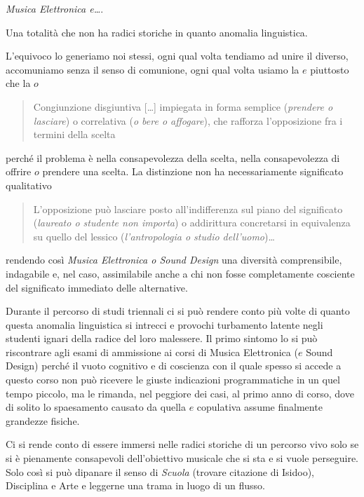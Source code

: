 \documentclass[
	10pt,
	a4paper,
	twocolumn
	]{article}
\begin{document}
\emph{Musica Elettronica e\ldots}. 

Una totalità che non ha radici storiche in quanto anomalia linguistica.

L'equivoco lo generiamo noi stessi, ogni qual volta tendiamo ad unire il diverso, accomuniamo senza il senso di comunione, ogni qual volta usiamo la $ e $ piuttosto che la $ o $

\begin{quote}
Congiunzione disgiuntiva [\ldots]  impiegata in forma semplice (\emph{prendere o lasciare}) o correlativa (\emph{o bere o affogare}), che rafforza l'opposizione fra i termini della scelta
\end{quote}

perché il problema è nella consapevolezza della scelta, nella consapevolezza di offrire $ o $ prendere una scelta. La distinzione non ha necessariamente significato qualitativo

\begin{quote}
L'opposizione può lasciare posto all'indifferenza sul piano del significato (\emph{laureato o studente non importa}) o addirittura concretarsi in equivalenza su quello del lessico (\emph{l'antropologia o studio dell'uomo})\ldots
\end{quote}

rendendo così \emph{Musica Elettronica o Sound Design} una diversità comprensibile, indagabile e, nel caso, assimilabile anche a chi non fosse completamente cosciente del significato immediato delle alternative.

Durante il percorso di studi triennali ci si può rendere conto più volte di quanto questa anomalia linguistica si intrecci e provochi turbamento latente negli studenti ignari della radice del loro malessere. Il primo sintomo lo si può riscontrare agli esami di ammissione ai corsi di Musica Elettronica ($ e $ Sound Design) perché il vuoto cognitivo e di coscienza con il quale spesso si accede a questo corso non può ricevere le giuste indicazioni programmatiche in un quel tempo piccolo, ma le rimanda, nel peggiore dei casi, al primo anno di corso, dove di solito lo spaesamento causato da quella $ e $ copulativa assume finalmente grandezze fisiche. 

Ci si rende conto di essere immersi nelle radici storiche di un percorso vivo solo se si è pienamente consapevoli dell'obiettivo musicale che si sta e si vuole perseguire. Solo così si può dipanare il senso di \emph{Scuola} (trovare citazione di Isidoo), Disciplina e Arte e leggerne una trama in luogo di un flusso. 
\end{document}
